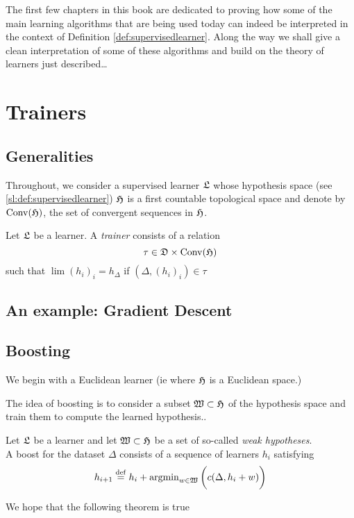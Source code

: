 \noindent The first few chapters in this book are dedicated to proving how some of the main learning algorithms that are being used today can indeed be interpreted in the context of Definition \ref{def:supervisedlearner}. Along the way we shall give a clean interpretation of some of these algorithms and build on the theory of learners just described\ldots
\section{Trainers}
\subsection{Generalities}

Throughout, we consider a supervised learner $\mathfrak{L}$ whose hypothesis space (see \ref{sl:def:supervisedlearner}) $\mathfrak{H}$ is a first countable topological space and denote by $\operatorname{Conv}(\mathfrak{H})$, the set of convergent sequences in $\mathfrak{H}$.\\

\begin{definition}
Let $\mathfrak{L}$ be a learner. A \emph{trainer} consists of a relation
\[
\tau \in \mathfrak{D}\times \operatorname{Conv}(\mathfrak{H})
\]
such that $\lim (h_i)_i =h_\Delta$ if $(\Delta,(h_i)_i)\in \tau$
\end{definition}
\subsection{An example: Gradient Descent}

\subsection{Boosting}

We begin with a Euclidean learner (ie where $\mathfrak{H}$ is a Euclidean space.)

The idea of boosting is to consider a subset $\mathfrak{W}\subset \mathfrak{H}$ of the hypothesis space and train them to compute the learned hypothesis..

\begin{definition}
Let $\mathfrak{L}$ be a learner and let $\mathfrak{W}\subset \mathfrak{H}$ be a set of so-called \emph{weak hypotheses}.\\
A boost for the dataset $\Delta $ consists of a sequence of learners $h_i$ satisfying
\[
h_{i+1} \stackrel{\operatorname{def}}{=} h_i+\operatorname{argmin}_{w\in \mathfrak{W}}\bigg(c(\Delta, h_i+w)\bigg)
\]
\end{definition}

\noindent We hope that the following theorem is true

